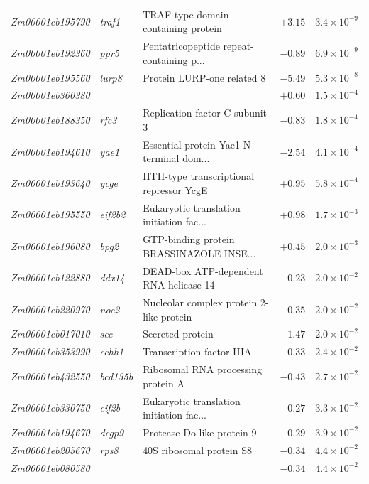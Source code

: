 \documentclass[9pt,twocolumn,twoside]{rilabRxiv}
\begin{document}
\begin{table}[!ht]
\begin{tabular}{@{}lllrr@{}}
\textit{Zm00001eb195790} & \textit{traf1} & TRAF-type domain containing protein & $+3.15$ & $3.4 \times 10^{-9}$ \\
\textit{Zm00001eb192360} & \textit{ppr5} & Pentatricopeptide repeat-containing p... & $-0.89$ & $6.9 \times 10^{-9}$ \\
\textit{Zm00001eb195560} & \textit{lurp8} & Protein LURP-one related 8 & $-5.49$ & $5.3 \times 10^{-8}$ \\
\textit{Zm00001eb360380} &  &  & $+0.60$ & $1.5 \times 10^{-4}$ \\
\textit{Zm00001eb188350} & \textit{rfc3} & Replication factor C subunit 3 & $-0.83$ & $1.8 \times 10^{-4}$ \\
\textit{Zm00001eb194610} & \textit{yae1} & Essential protein Yae1 N-terminal dom... & $-2.54$ & $4.1 \times 10^{-4}$ \\
\textit{Zm00001eb193640} & \textit{ycge} & HTH-type transcriptional repressor YcgE & $+0.95$ & $5.8 \times 10^{-4}$ \\
\textit{Zm00001eb195550} & \textit{eif2b2} & Eukaryotic translation initiation fac... & $+0.98$ & $1.7 \times 10^{-3}$ \\
\textit{Zm00001eb196080} & \textit{bpg2} & GTP-binding protein BRASSINAZOLE INSE... & $+0.45$ & $2.0 \times 10^{-3}$ \\
\textit{Zm00001eb122880} & \textit{ddx14} & DEAD-box ATP-dependent RNA helicase 14 & $-0.23$ & $2.0 \times 10^{-2}$ \\
\textit{Zm00001eb220970} & \textit{noc2} & Nucleolar complex protein 2-like protein & $-0.35$ & $2.0 \times 10^{-2}$ \\
\textit{Zm00001eb017010} & \textit{sec} & Secreted protein & $-1.47$ & $2.0 \times 10^{-2}$ \\
\textit{Zm00001eb353990} & \textit{cchh1} & Transcription factor IIIA & $-0.33$ & $2.4 \times 10^{-2}$ \\
\textit{Zm00001eb432550} & \textit{bcd135b} & Ribosomal RNA processing protein A & $-0.43$ & $2.7 \times 10^{-2}$ \\
\textit{Zm00001eb330750} & \textit{eif2b} & Eukaryotic translation initiation fac... & $-0.27$ & $3.3 \times 10^{-2}$ \\
\textit{Zm00001eb194670} & \textit{degp9} & Protease Do-like protein 9 & $-0.29$ & $3.9 \times 10^{-2}$ \\
\textit{Zm00001eb205670} & \textit{rps8} & 40S ribosomal protein S8 & $-0.34$ & $4.4 \times 10^{-2}$ \\
\textit{Zm00001eb080580} &  &  & $-0.34$ & $4.4 \times 10^{-2}$ \\

\end{tabular}
\end{table}
\end{document}

